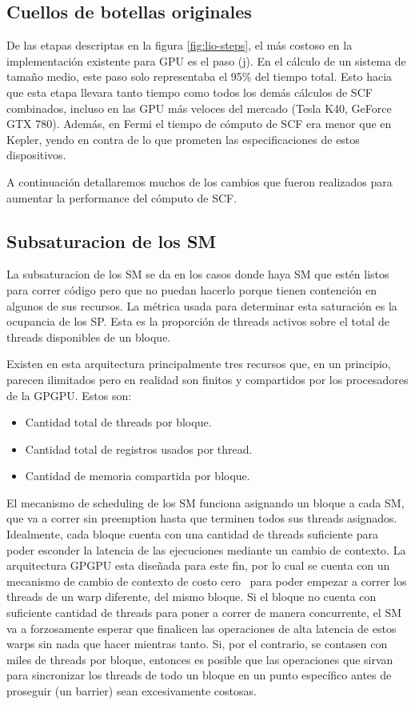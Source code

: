 \subsection{Cuellos de botellas originales}

De las etapas descriptas en la figura \ref{fig:lio-steps}, el m\'as costoso
en la implementaci\'on existente para GPU es el paso (j). En el c\'alculo de un sistema
de tama\~no medio, este paso solo representaba el 95\% del tiempo total. Esto hacia
que esta etapa llevara tanto tiempo como todos los dem\'as c\'alculos de SCF combinados, incluso
en las GPU m\'as veloces del mercado (Tesla K40, GeForce GTX 780). Adem\'as, en Fermi
el tiempo de c\'omputo de SCF era menor que en Kepler, yendo en contra de lo que prometen
las especificaciones de estos dispositivos.

A continuaci\'on detallaremos muchos de los cambios que fueron realizados para aumentar
la performance del c\'omputo de SCF.

\subsection{Subsaturacion de los SM}
La subsaturacion de los SM se da en los casos donde haya SM que est\'en listos para correr
c\'odigo pero que no puedan hacerlo porque tienen contenci\'on en algunos de sus recursos.
La m\'etrica usada para determinar esta saturaci\'on es la ocupancia de los SP.
Esta es la proporci\'on de threads activos sobre el total de threads disponibles de un bloque.

Existen en esta arquitectura principalmente tres recursos que, en un principio, parecen
ilimitados pero en realidad son finitos y compartidos por los procesadores de la GPGPU.
Estos son:
\begin{itemize}
\item Cantidad total de threads por bloque.
\item Cantidad total de registros usados por thread.
\item Cantidad de memoria compartida por bloque.
\end{itemize}

El mecanismo de scheduling de los SM funciona asignando un bloque a cada SM, que
va a correr sin preemption hasta que terminen todos sus threads asignados. Idealmente, cada
bloque cuenta con una cantidad de threads suficiente para poder esconder la latencia
de las ejecuciones mediante un cambio de contexto. La arquitectura GPGPU esta dise\~nada
para este fin, por lo cual se cuenta con un mecanismo de cambio de contexto de costo cero~\cite{NvidiaFermi} para
poder empezar a correr los threads de un warp diferente, del mismo bloque.
Si el bloque no cuenta con suficiente cantidad de threads para poner a correr de manera
concurrente, el SM va a forzosamente esperar que finalicen las operaciones de alta latencia
de estos warps sin nada que hacer mientras tanto. Si, por el contrario, se contasen con
miles de threads por bloque, entonces es posible que las operaciones que sirvan
para sincronizar los threads de todo un bloque en un punto espec\'ifico antes de proseguir
(un barrier) sean excesivamente costosas.

